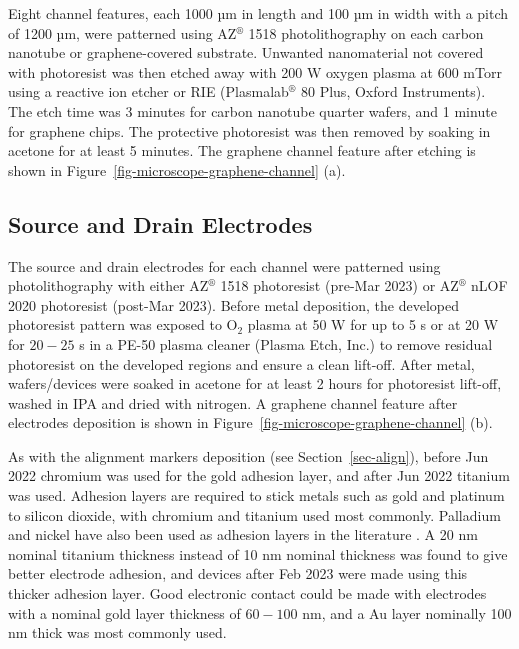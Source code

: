 \documentclass[
  a4paper,
]{scrbook}
\begin{document}
Eight channel features, each 1000 µm in length and 100 µm in width with
a pitch of 1200 µm, were patterned using AZ\(^\circledR\) 1518
photolithography on each carbon nanotube or graphene-covered substrate.
Unwanted nanomaterial not covered with photoresist was then etched away
with 200 W oxygen plasma at 600 mTorr using a reactive ion etcher or RIE
(Plasmalab\(^\circledR\) 80 Plus, Oxford Instruments). The etch time was
3 minutes for carbon nanotube quarter wafers, and 1 minute for graphene
chips. The protective photoresist was then removed by soaking in acetone
for at least 5 minutes. The graphene channel feature after etching is
shown in Figure~\ref{fig-microscope-graphene-channel} (a).

\hypertarget{sec-electrodes}{%
\subsection{Source and Drain Electrodes}\label{sec-electrodes}}

The source and drain electrodes for each channel were patterned using
photolithography with either AZ\(^\circledR\) 1518 photoresist (pre-Mar
2023) or AZ\(^\circledR\) nLOF 2020 photoresist (post-Mar 2023). Before
metal deposition, the developed photoresist pattern was exposed to
O\(_2\) plasma at 50 W for up to 5 s or at 20 W for \(20-25\) s in a
PE-50 plasma cleaner (Plasma Etch, Inc.) to remove residual photoresist
on the developed regions and ensure a clean lift-off. After metal,
wafers/devices were soaked in acetone for at least 2 hours for
photoresist lift-off, washed in IPA and dried with nitrogen. A graphene
channel feature after electrodes deposition is shown in
Figure~\ref{fig-microscope-graphene-channel} (b).

As with the alignment markers deposition (see Section~\ref{sec-align}),
before Jun 2022 chromium was used for the gold adhesion layer, and after
Jun 2022 titanium was used. Adhesion layers are required to stick metals
such as gold and platinum to silicon dioxide, with chromium and titanium
used most commonly. Palladium and nickel have also been used as adhesion
layers in the literature \autocite{Guarnieri2014,Shkodra2021}. A 20 nm
nominal titanium thickness instead of 10 nm nominal thickness was found
to give better electrode adhesion, and devices after Feb 2023 were made
using this thicker adhesion layer. Good electronic contact could be made
with electrodes with a nominal gold layer thickness of \(60-100\) nm,
and a Au layer nominally 100 nm thick was most commonly used.
\end{document}
